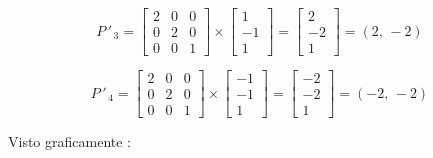 \documentclass[10pt, twocolumn, landscape, a4paper]{article}
\begin{document}
$$P\,'_{\,3} = \begin{bmatrix} 2 & 0 & 0 \\ 0 & 2 & 0 \\ 0 & 0 & 1 \end{bmatrix} \times \begin{bmatrix} 1 \\ -1 \\ 1 \end{bmatrix} = \begin{bmatrix} 2 \\ -2 \\ 1 \end{bmatrix} = (2,\,-2)$$

$$P\,'_{\,4} = \begin{bmatrix} 2 & 0 & 0 \\ 0 & 2 & 0 \\ 0 & 0 & 1 \end{bmatrix} \times \begin{bmatrix} -1 \\ -1 \\ 1 \end{bmatrix} = \begin{bmatrix} -2 \\ -2 \\ 1 \end{bmatrix} = (-2,\,-2)$$

\noindent Visto graficamente :
\end{document}

